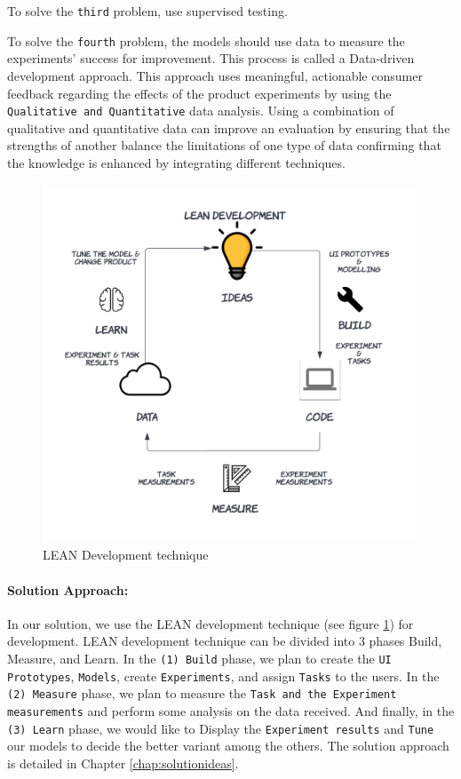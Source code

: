 To solve the \texttt{third} problem, use supervised testing.

To solve the \texttt{fourth} problem, the models should use data to measure the experiments' success for improvement. This process is called a Data-driven development approach. 
This approach uses meaningful, actionable consumer feedback regarding the effects of the product experiments by using the \texttt{Qualitative and Quantitative} data analysis.
Using a combination of qualitative and quantitative data can improve an evaluation by ensuring that the strengths of another balance the limitations of one type of data confirming that the knowledge is enhanced by integrating different techniques.

\begin{figure}[ht]
    \centering
    \includegraphics[scale=0.15]{images/solution-ideas/LEAN.png}
    \caption{LEAN Development technique}
    \label{intro:fig:lean}
\end{figure}
\par

\paragraph{Solution Approach:} In our solution, we use the LEAN development technique (see figure \ref{intro:fig:lean}) for development. LEAN development technique can be divided into 3 phases Build, Measure, and Learn. 
In the \texttt{(1) Build} phase, we plan to create the \texttt{UI Prototypes}, \texttt{Models}, create \texttt{Experiments}, and assign \texttt{Tasks} to the users. 
In the \texttt{(2) Measure} phase, we plan to measure the \texttt{Task and the Experiment measurements} and perform some analysis on the data received. 
And finally, in the \texttt{(3) Learn} phase, we would like to Display the \texttt{Experiment results} and \texttt{Tune} our models to decide the better variant among the others. The solution approach is detailed in Chapter \ref{chap:solutionideas}.